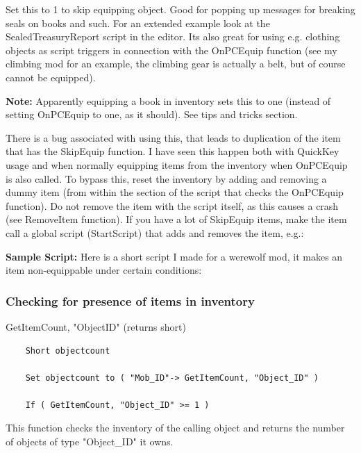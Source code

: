 Set this to 1 to skip equipping object. Good for popping up messages for
breaking seals on books and such. For an extended example look at the
SealedTreasuryReport script in the editor. Its also great for using e.g.
clothing objects as script triggers in connection with the OnPCEquip
function (see my climbing mod for an example, the climbing gear is
actually a belt, but of course cannot be equipped).

\textbf{Note:} Apparently equipping a book in inventory sets this to one
(instead of setting OnPCEquip to one, as it should). See tips and tricks
section.

There is a bug associated with using this, that leads to duplication of
the item that has the SkipEquip function. I have seen this happen both
with QuickKey usage and when normally equipping items from the inventory
when OnPCEquip is also called. To bypass this, reset the inventory by
adding and removing a dummy item (from within the section of the script
that checks the OnPCEquip function). Do not remove the item with the
script itself, as this causes a crash (see RemoveItem function). If you
have a lot of SkipEquip items, make the item call a global script
(StartScript) that adds and removes the item, e.g.:



\textbf{Sample Script:} Here is a short script I made for a werewolf
mod, it makes an item non-equippable under certain conditions:



\hypertarget{checking-for-presence-of-items-in-inventory}{%
\subsubsection{Checking for presence of items in
inventory}\label{checking-for-presence-of-items-in-inventory}}

	GetItemCount, "ObjectID" (returns short)

\begin{lstlisting}	
	Short objectcount
	
	Set objectcount to ( "Mob_ID"-> GetItemCount, "Object_ID" )
	
	If ( GetItemCount, "Object_ID" >= 1 )
\end{lstlisting}

This function checks the inventory of the calling object and returns the
number of objects of type "Object\_ID" it owns.

